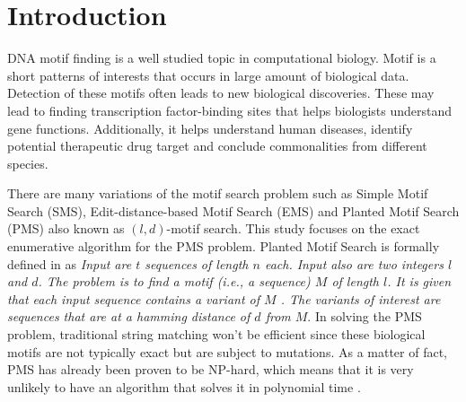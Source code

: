 \section{Introduction}

	DNA motif finding is a well studied topic in computational biology. Motif is a short patterns of interests that occurs in large amount of biological data. Detection of these motifs often leads to new biological discoveries. These may lead to finding transcription factor-binding sites that helps biologists understand gene functions. Additionally, it helps understand human diseases, identify potential therapeutic drug target and conclude commonalities from different species.

	There are many variations of the motif search problem such as Simple Motif Search (SMS), Edit-distance-based Motif Search (EMS) and Planted Motif Search (PMS) also known as $(l, d)$-motif search. This study focuses on the exact enumerative algorithm for the PMS problem. Planted Motif Search is formally defined in \cite{ExactAlgorithmsPMS} as \emph{Input are $t$ sequences of length $n$ each. Input also are two integers $l$ and $d$. The problem is to find a motif (i.e., a sequence) $M$ of length $l$. It is given that each input sequence contains a variant of $M$ . The variants of interest are sequences that are at a hamming distance of $d$ from $M$}. In solving the PMS problem, traditional string matching won't be efficient since these biological motifs are not typically exact but are subject to mutations. As a matter of fact, PMS has already been proven to be NP-hard, which means that it is very unlikely to have an algorithm that solves it in polynomial time \cite{Evans2003407}.


